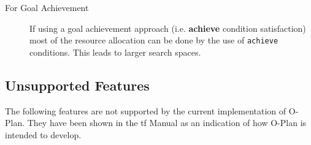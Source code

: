 \begin{description}
\item[For Goal Achievement]
If using a goal achievement approach (i.e. {\bf achieve} condition
satisfaction) most of the resource allocation can be done by the use of
{\tt achieve} conditions.  This leads to larger search spaces.

\end{description}

\label{current-implementation}

\subsection{Unsupported Features}
The following features are not supported by the current implementation
of O-Plan.  They have been shown in the {\sc tf} Manual as an indication
of how O-Plan is intended to develop.

